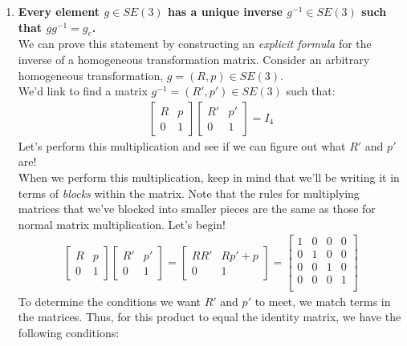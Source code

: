 \documentclass[oneside]{book}
\begin{document}
\begin{enumerate}
    \item \textbf{Every element $g \in SE(3)$ has a unique inverse $g^{-1} \in SE(3)$ such that $g g^{-1} = g_e$.}\\ We can prove this statement by constructing an \textit{explicit formula} for the inverse of a homogeneous transformation matrix. Consider an arbitrary homogeneous transformation, $g = (R, p) \in SE(3)$.\\
    We'd link to find a matrix $g^{-1} = (R', p') \in SE(3)$ such that:
    \begin{align}
        \begin{bmatrix}
        R & p\\
        0 & 1
        \end{bmatrix}
        \begin{bmatrix}
        R' & p'\\
        0 & 1
        \end{bmatrix}
         = I_4
    \end{align}
    Let's perform this multiplication and see if we can figure out what $R'$ and $p'$ are!\\
    When we perform this multiplication, keep in mind that we'll be writing it in terms of \textit{blocks} within the matrix. Note that the rules for multiplying matrices that we've blocked into smaller pieces are the same as those for normal matrix multiplication. Let's begin!
    \begin{align}
        \begin{bmatrix}
        R & p\\
        0 & 1
        \end{bmatrix}
        \begin{bmatrix}
        R' & p'\\
        0 & 1
        \end{bmatrix}
        = 
        \begin{bmatrix}
        RR' & Rp' + p\\
        0 & 1
        \end{bmatrix} = 
        \begin{bmatrix}
        1 & 0 & 0 & 0\\
        0 & 1 & 0 & 0\\
        0 & 0 & 1 & 0\\
        0 & 0 & 0 & 1\\
        \end{bmatrix}
    \end{align}
    To determine the conditions we want $R'$ and $p'$ to meet, we match terms in the matrices. Thus, for this product to equal the identity matrix, we have the following conditions:

\end{enumerate}
\end{document}
